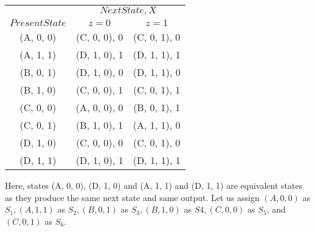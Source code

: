 \documentclass[8pt]{beamer}
\begin{document}
\begin{frame}
\begin{center}
\begin{tabular}{ccc}
 \hline

 \hline

 \hline

 \hline
 & \multicolumn{2}{c}{$Next State,X$}\\
 \cline{2-3}
 $Present State$ &  $z=0$ & $z=1$\\
\hline
(A, 0, 0)  &  (C, 0, 0), 0  &  (C, 0, 1), 0\\
(A, 1, 1)  &  (D, 1, 0), 1  &  (D, 1, 1), 1\\
(B, 0, 1)  &  (D, 1, 0), 0  &  (D, 1, 1), 0\\
(B, 1, 0)  &  (C, 0, 0), 1  &  (C, 0, 1), 1\\
(C, 0, 0)  &  (A, 0, 0), 0  &  (B, 0, 1), 1\\
(C, 0, 1)  &  (B, 1, 0), 1  &  (A, 1, 1), 0\\
(D, 1, 0)  &  (C, 0, 0), 0  &  (C, 0, 1), 0\\
(D, 1, 1)  &  (D, 1, 0), 1  &  (D, 1, 1), 1\\
 \hline

 \hline

 \hline

 \hline
\end{tabular}
\end{center}

\vspace*{0.4cm}
\hspace*{0.5cm} Here, states (A, 0, 0), (D, 1, 0) and (A, 1, 1) and (D, 1, 1) are equivalent states as they produce
the same next state and same output. Let us assign $(A, 0, 0)$ as $S_1, (A, 1, 1)$ as $S_2, (B, 0, 1)$ as $S_3,
(B, 1, 0)$ as $S4, (C, 0, 0)$ as $S_5$, and $(C, 0, 1)$ as $S_6$.\\
\end{frame}
\end{document}
